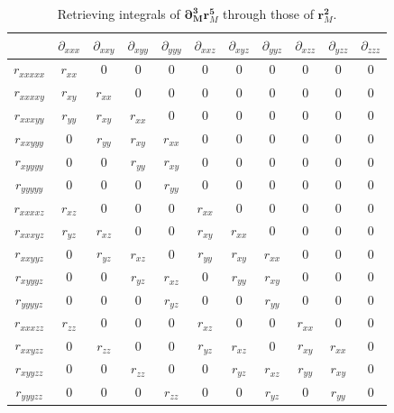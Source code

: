 \documentclass[a4paper,11pt,twoside,openright]{book}
\begin{document}
\begin{table}[hbtp]
  \centering
  \caption{Retrieving integrals of $\boldsymbol{\partial}_{\boldsymbol{M}}^{\boldsymbol{3}}\boldsymbol{r}_{M}^{\boldsymbol{5}}$
    through those of $\boldsymbol{r}_{M}^{\boldsymbol{2}}$.}
  \label{tab:geom-diporg}
  \begin{tabular}{c||c|c|c|c||c|c|c||c|c||c}
    \hline
    & $\partial_{xxx}$ & $\partial_{xxy}$ & $\partial_{xyy}$ & $\partial_{yyy}$ & $\partial_{xxz}$ %
      & $\partial_{xyz}$ & $\partial_{yyz}$ & $\partial_{xzz}$ & $\partial_{yzz}$ & $\partial_{zzz}$\\
    \hline
    $r_{xxxxx}$ & $r_{xx}$ & 0 & 0 & 0 & 0 & 0 & 0 & 0 & 0 & 0\\
    \hline
    $r_{xxxxy}$ & $r_{xy}$ & $r_{xx}$ & 0 & 0 & 0 & 0 & 0 & 0 & 0 & 0\\
    \hline
    $r_{xxxyy}$ & $r_{yy}$ & $r_{xy}$ & $r_{xx}$ & 0 & 0 & 0 & 0 & 0 & 0 & 0\\
    \hline
    $r_{xxyyy}$ & 0 & $r_{yy}$ & $r_{xy}$ & $r_{xx}$ & 0 & 0 & 0 & 0 & 0 & 0\\
    \hline
    $r_{xyyyy}$ & 0 & 0 & $r_{yy}$ & $r_{xy}$ & 0 & 0 & 0 & 0 & 0 & 0\\
    \hline
    $r_{yyyyy}$ & 0 & 0 & 0 & $r_{yy}$ & 0 & 0 & 0 & 0 & 0 & 0\\
    \hline\hline
    $r_{xxxxz}$ & $r_{xz}$ & 0 & 0 & 0 & $r_{xx}$ & 0 & 0 & 0 & 0 & 0\\
    \hline
    $r_{xxxyz}$ & $r_{yz}$ & $r_{xz}$ & 0 & 0 & $r_{xy}$ & $r_{xx}$ & 0 & 0 & 0 & 0\\
    \hline
    $r_{xxyyz}$ & 0 & $r_{yz}$ & $r_{xz}$ & 0 & $r_{yy}$ & $r_{xy}$ & $r_{xx}$ & 0 & 0 & 0\\
    \hline
    $r_{xyyyz}$ & 0 & 0 & $r_{yz}$ & $r_{xz}$ & 0 & $r_{yy}$ & $r_{xy}$ & 0 & 0 & 0\\
    \hline
    $r_{yyyyz}$ & 0 & 0 & 0 & $r_{yz}$ & 0 & 0 & $r_{yy}$ & 0 & 0 & 0\\
    \hline\hline
    $r_{xxxzz}$ & $r_{zz}$ & 0 & 0 & 0 & $r_{xz}$ & 0 & 0 & $r_{xx}$ & 0 & 0\\
    \hline
    $r_{xxyzz}$ & 0 & $r_{zz}$ & 0 & 0 & $r_{yz}$ & $r_{xz}$ & 0 & $r_{xy}$ & $r_{xx}$ & 0\\
    \hline
    $r_{xyyzz}$ & 0 & 0 & $r_{zz}$ & 0 & 0 & $r_{yz}$ & $r_{xz}$ & $r_{yy}$ & $r_{xy}$ & 0\\
    \hline
    $r_{yyyzz}$ & 0 & 0 & 0 & $r_{zz}$ & 0 & 0 & $r_{yz}$ & 0 & $r_{yy}$ & 0\\
    \hline\hline

\end{tabular}
\end{table}
\end{document}
